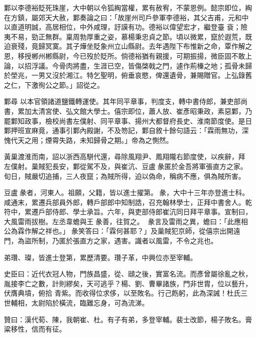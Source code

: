 \begin{pinyinscope}
 鄴以李德裕貶死珠崖，大中朝以令狐綯當權，累有赦宥，不蒙恩例。懿宗即位，綯在方鎮，屬郊天大赦，鄴奏論之曰：「故崖州司戶參軍李德裕，其父吉甫，元和中以直道明誠，高居相位，中外咸理，訏謨有功。德裕以偉望宏才，繼登臺
 袞；險夷不易，勁正無群。稟周勃厚重之姿，慕楊秉忠貞之節。頃以微累，竄於遐荒，既迫衰殘，竟歸冥寞。其子燁坐貶象州立山縣尉。去年遇陛下布惟新之命，覃作解之恩，移授郴州郴縣尉，今已歿於貶所。倘德裕猶有親援，可期振揚，微臣固不敢上論，以招浮議。今骨肉將盡，生涯已空，皆傷棨戟之門，遽作荊榛之地；孤骨未歸於塋兆，一男又沒於湘江。特乞聖明，俯垂哀愍，俾還遺骨，兼賜贈官。上弘錄舊之仁，下激徇公之節。」詔從之。



 鄴尋
 以本官領諸道鹽鐵轉運使。其年同平章事，判度支，轉中書侍郎，兼吏部尚書，累加太清宮使、弘文館大學士。僖宗即位，蕭人放、崔彥昭秉政，素惡鄴，乃罷鄴知政事，檢校尚書左僕射、同平章事、揚州大都督府長史、淮南節度使。是日鄴押班宣麻竟，通事引鄴內殿謝，不及笏記，鄴自敘十餘句語云：「霖雨無功，深愧代天之用；煙霄失路，未知歸骨之期。」帝為之惻然。



 黃巢渡淮而南，詔以浙西高駢代還，尋除風翔尹、鳳翔隴右節度使，以疾辭，拜
 左僕射。巢賊犯長安，鄴從駕不及，與崔沆、豆盧彖匿於金吾將軍張直方之家。旬日，賊嚴切追捕，三人夜竄；為賊所得，迫以偽命，稱病不應，俱為賊所害。



 豆盧彖者，河東人。祖願，父籍，皆以進士擢第。彖，大中十三年亦登進士科。咸通末，累遷兵部員外郎，轉戶部郎中知制誥，召充翰林學士，正拜中書舍人。乾符中，累遷戶部侍郎、學士承旨。六年，與吏部侍郎崔沆同日拜平章事。宣制曰，大風雷雨拔樹。左丞韋蟾與王彖善，往賀之。
 彖言及雷雨之異，蟾曰：「此應相公為霖作解之祥也。」彖笑答曰：「霖何甚耶？」及巢賊犯京師，從僖宗出開遠門，為盜所制，乃匿於張直方之家，遇害。識者以風雷，不令之兆也。



 弟瓚、璨，皆進士登第，累歷清要。瓚子革，中興位亦至宰輔。



 史臣曰：近代衣冠人物，門族昌盛，從、頲之後，實富名流。而彥曾屬徐亂之秋，胤接李亡之數，計則繆矣，天可逃乎？楊、劉、曹畢諸族，門非世胄，位以藝升，伏膺典墳，俯拾
 青紫。而收得位求侈，以至敗名。行己飭躬，此為深誡！杜氏三世輔相，太尉陷於橫流，臨難忘身，可為流涕。



 贊曰：漢代荀、陳，我朝崔、杜。有子有弟，多登宰輔。裴士改節，楊子敗名。膏粱移性，信而有征。



\end{pinyinscope}